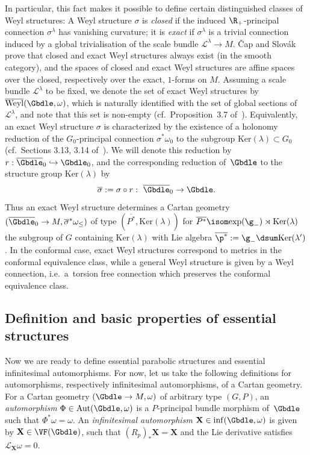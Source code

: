{\sloppy In particular, this fact makes it possible to def\/ine certain distinguished classes of Weyl structures: A Weyl structure $\sigma$ is \emph{closed} if the induced $\R_+$-principal connection $\sigma^{\lambda}$ has vanishing curvature; it is \emph{exact} if $\sigma^{\lambda}$ is a trivial connection induced by a global trivialisation of the scale bundle $\mathcal{L}^{\lambda} \rightarrow M$. \v{C}ap and Slov\'ak prove that closed and exact Weyl structures always exist (in the smooth category), and the spaces of closed and exact Weyl structures are af\/f\/ine spaces over the closed, respectively over the exact, $1$-forms on $M$. Assuming a scale bundle $\mathcal{L}^{\lambda}$ to be f\/ixed, we denote the set of exact Weyl structures by $\overline{\mathrm{Weyl}}(\Gbdle,\omega)$, which is naturally identif\/ied with the set of global sections of $\mathcal{L}^{\lambda}$, and note that this set is non-empty (cf.\ Proposition~3.7 of~\cite{CS03}). Equivalently, an exact Weyl structure $\sigma$ is characterized by the existence of a holonomy reduction of the $G_0$-principal connection $\sigma^*\omega_0$ to the subgroup $\mathrm{Ker}(\lambda) \subset G_0$ (cf.\ Sections 3.13, 3.14 of~\cite{CS03}). We will denote this reduction by $r: \overline{\Gbdle}_0 \hookrightarrow \Gbdle_0$, and the corresponding reduction of~$\Gbdle$ to the structure group $\mathrm{Ker}(\lambda)$ by
\[
\overline{\sigma} := \sigma \circ r: \ \overline{\Gbdle}_0 \rightarrow \Gbdle.
\]
Thus an exact Weyl structure determines a Cartan geometry $(\overline{\Gbdle}_0 \rightarrow M,\overline{\sigma}^*\omega_{\leq})$ of type $(\overline{P^*},\mathrm{Ker}(\lambda))$ for $\overline{P^*} \isom \mathrm{exp}(\g_-) \rtimes \mathrm{Ker}(\lambda)$ the subgroup of $G$ containing $\mathrm{Ker}(\lambda)$ with Lie algebra $\overline{\p^*} := \g_- \dsum \mathrm{Ker}(\lambda')$. In the conformal case, exact Weyl structures correspond to metrics in the conformal equivalence class, while a general Weyl structure is given by a Weyl connection, i.e.\ a~torsion free connection which preserves the conformal equivalence class.

}

\subsection{Def\/inition and basic properties of essential structures}\label{section2.2}

Now we are ready to def\/ine essential parabolic structures and essential inf\/initesimal automorphisms. For now, let us take the following def\/initions for automorphisms, respectively inf\/initesimal automorphisms, of a Cartan geometry. For a Cartan geometry $(\Gbdle \rightarrow M,\omega)$ of arbitrary type $(G,P)$, an \emph{automorphism} $\Phi \in \mathrm{Aut}(\Gbdle,\omega)$ is a $P$-principal bundle morphism of~$\Gbdle$ such that $\Phi^*\omega = \omega$. An \emph{infinitesimal automorphism} $\mathbf{X} \in \mathrm{inf}(\Gbdle,\omega)$ is given by $\mathbf{X} \in \VF(\Gbdle)$, such that $(R_p)_*\mathbf{X} = \mathbf{X}$ and the Lie derivative satisf\/ies $\mathcal{L}_{\mathbf{X}} \omega = 0$.

